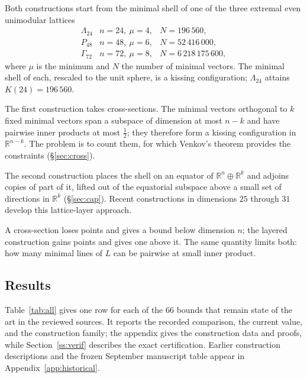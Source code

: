 \documentclass[11pt]{amsart}
\theoremstyle{remark}
\newcommand{\Leech}{\Lambda_{24}}
\newcommand{\Pff}{P_{48}}
\newcommand{\Gsz}{\Gamma_{72}}
\newcommand{\R}{\mathbb{R}}
\begin{document}
Both constructions start from the minimal shell of one of the three extremal
even unimodular lattices
\[
\begin{array}{lll}
  \Leech & n=24,\ \mu=4, & N=196\,560,\\
  \Pff   & n=48,\ \mu=6, & N=52\,416\,000,\\
  \Gsz   & n=72,\ \mu=8, & N=6\,218\,175\,600,
\end{array}
\]
where $\mu$ is the minimum and $N$ the number of minimal vectors. The minimal
shell of each, rescaled to the unit sphere, is a kissing configuration; $\Leech$
attains $K(24)=196\,560$.

The first construction takes cross-sections. The minimal vectors orthogonal to
$k$ fixed minimal vectors span a subspace of dimension at most $n-k$ and have
pairwise inner products at most $\tfrac12$; they therefore form a kissing
configuration in $\R^{n-k}$. The problem is to count them, for which Venkov's
theorem provides the constraints (\S\ref{sec:cross}).

The second construction places the shell on an equator of $\R^{n}\oplus\R^{k}$
and adjoins copies of part of it, lifted out of the equatorial subspace above a
small set of directions in $\R^{k}$ (\S\ref{sec:cap}). Recent constructions in
dimensions $25$ through $31$ develop this lattice-layer approach.

A cross-section loses points and gives a bound below dimension $n$; the layered
construction gains points and gives one above it. The same quantity limits both:
how many minimal lines of $L$ can be pairwise at small inner product.

\subsection{Results}

Table~\ref{tab:all} gives one row for each of the $66$ bounds that
remain state of the art in the reviewed sources. It reports the recorded
comparison, the current value, and the construction family; the appendix gives
the construction data and proofs, while Section~\ref{ss:verif} describes the
exact certification. Earlier construction descriptions and the frozen
September manuscript table appear in Appendix~\ref{app:historical}.
\end{document}
